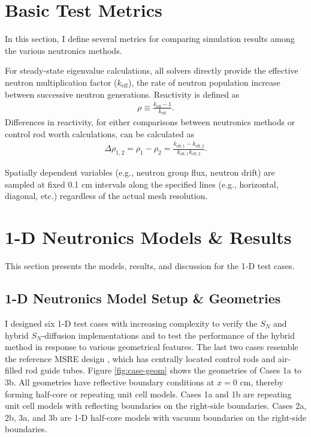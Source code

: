 \section{Basic Test Metrics} \label{sec:test-metrics}

In this section, I define several metrics for comparing simulation results among the various
neutronics methods.

For steady-state eigenvalue calculations, all solvers directly provide the effective neutron
multiplication factor ($k_\text{eff}$), the rate of neutron population increase between successive
neutron generations. Reactivity is defined as
%
\begin{gather}
  \rho \equiv \frac{k_\text{eff}-1}{k_\text{eff}}.
\end{gather}
%
Differences in reactivity, for either comparisons between neutronics methods or control rod worth
calculations, can be calculated as
%
\begin{gather}
  \Delta\rho_{1,2} = \rho_1 - \rho_2 =
  \frac{k_{\text{eff},1}-k_{\text{eff},2}}{k_{\text{eff},1}k_{\text{eff},2}}.
\end{gather}

Spatially dependent variables (e.g., neutron group flux, neutron drift) are sampled at fixed 0.1 cm
intervals along the specified lines (e.g., horizontal, diagonal, etc.) regardless of the actual
mesh resolution.

\section{1-D Neutronics Models \& Results} \label{sec:1d-results}

This section presents the models, results, and discussion for the 1-D test cases.

\subsection{1-D Neutronics Model Setup \& Geometries}

I designed six 1-D test cases with increasing complexity to verify the $S_N$ and hybrid
$S_N$-diffusion implementations and to test the performance of the hybrid
method in response to various geometrical features. The last two cases resemble the
reference \gls{MSRE} design \cite{robertson_msre_1965}, which has centrally located control rods
and air-filled rod guide tubes. Figure \ref{fig:case-geom} shows the geometries of Cases 1a to
3b. All geometries have reflective boundary conditions at $x=0$ cm, thereby
forming half-core or repeating unit cell models. Cases 1a and 1b are repeating unit
cell models with reflecting boundaries on the right-side boundaries. Cases 2a, 2b, 3a, and 3b
are 1-D half-core models with vacuum boundaries on the right-side boundaries.

